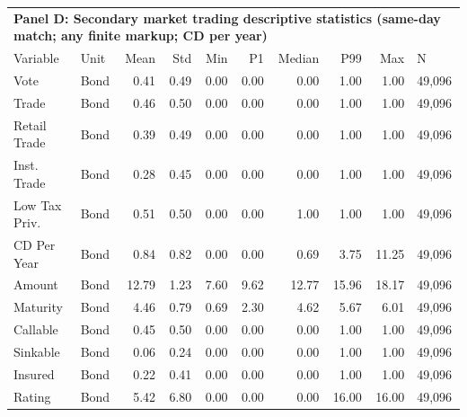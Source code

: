 \begin{table}[H]
\centering
\begin{tabular*}{\textwidth}{@{\extracolsep{\fill}}llrrrrrrrl}
\multicolumn{10}{l}{\textbf{Panel D: Secondary market trading descriptive statistics (same-day match; any finite markup; CD per year)}}\\

\addlinespace
  \toprule
Variable & Unit & Mean & Std & Min & P1 & Median & P99 & Max & N \\ 
  \hline
Vote & Bond & 0.41 & 0.49 & 0.00 & 0.00 & 0.00 & 1.00 & 1.00 & 49,096 \\ 
  Trade & Bond & 0.46 & 0.50 & 0.00 & 0.00 & 0.00 & 1.00 & 1.00 & 49,096 \\ 
  Retail Trade & Bond & 0.39 & 0.49 & 0.00 & 0.00 & 0.00 & 1.00 & 1.00 & 49,096 \\ 
  Inst. Trade & Bond & 0.28 & 0.45 & 0.00 & 0.00 & 0.00 & 1.00 & 1.00 & 49,096 \\ 
  Low Tax Priv. & Bond & 0.51 & 0.50 & 0.00 & 0.00 & 1.00 & 1.00 & 1.00 & 49,096 \\ 
  CD Per Year & Bond & 0.84 & 0.82 & 0.00 & 0.00 & 0.69 & 3.75 & 11.25 & 49,096 \\ 
  Amount & Bond & 12.79 & 1.23 & 7.60 & 9.62 & 12.77 & 15.96 & 18.17 & 49,096 \\ 
  Maturity & Bond & 4.46 & 0.79 & 0.69 & 2.30 & 4.62 & 5.67 & 6.01 & 49,096 \\ 
  Callable & Bond & 0.45 & 0.50 & 0.00 & 0.00 & 0.00 & 1.00 & 1.00 & 49,096 \\ 
  Sinkable & Bond & 0.06 & 0.24 & 0.00 & 0.00 & 0.00 & 1.00 & 1.00 & 49,096 \\ 
  Insured & Bond & 0.22 & 0.41 & 0.00 & 0.00 & 0.00 & 1.00 & 1.00 & 49,096 \\ 
  Rating & Bond & 5.42 & 6.80 & 0.00 & 0.00 & 0.00 & 16.00 & 16.00 & 49,096 \\ 
   \hline
\end{tabular*}
\end{table}
